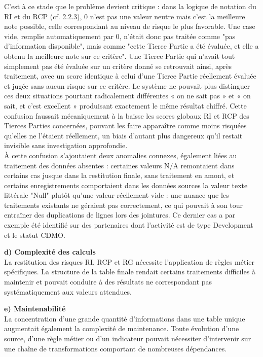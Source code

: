 C'est à ce stade que le problème devient critique : dans la logique de notation du RI et 
du RCP (cf. 2.2.3), 0 n'est pas une valeur neutre mais c'est la meilleure note possible, celle 
correspondant au niveau de risque le plus favorable. Une case vide, remplie automatiquement 
par 0, n'était donc pas traitée comme "pas d'information disponible", mais comme "cette Tierce 
Partie a été évaluée, et elle a obtenu la meilleure note sur ce critère". Une Tierce Partie qui 
n'avait tout simplement pas été évaluée sur un critère donné se retrouvait ainsi, après 
traitement, avec un score identique à celui d'une Tierce Partie réellement évaluée et jugée 
sans aucun risque sur ce critère. Le système ne pouvait plus distinguer ces deux situations 
pourtant radicalement différentes « on ne sait pas » et « on sait, et c'est excellent » produisant 
exactement le même résultat chiffré. Cette confusion faussait mécaniquement à la baisse les 
scores globaux RI et RCP des Tierces Parties concernées, pouvant les faire apparaître comme 
moins risquées qu'elles ne l'étaient réellement, un biais d'autant plus dangereux qu'il restait 
invisible sans investigation approfondie. \\

À cette confusion s'ajoutaient deux anomalies connexes, également liées au traitement 
des données absentes : certaines valeurs N/A remontaient dans certains cas jusque dans la 
restitution finale, sans traitement en amont, et certains enregistrements comportaient dans les 
données sources la valeur texte littérale "Null" plutôt qu'une valeur réellement vide : une 
nuance que les traitements existants ne géraient pas correctement, ce qui pouvait à son tour 
entraîner des duplications de lignes lors des jointures. Ce dernier cas a par exemple été 
identifié sur des partenaires dont l'activité est de type Development et le statut CDMO. 

\textbf{d) Complexité des calculs }\\
La restitution des risques RI, RCP et RG nécessite l’application de règles métier 
spécifiques. La structure de la table finale rendait certains traitements difficiles à maintenir et 
pouvait conduire à des résultats ne correspondant pas systématiquement aux valeurs 
attendues. 

\textbf{e) Maintenabilité }\\
La concentration d’une grande quantité d’informations dans une table unique augmentait 
également la complexité de maintenance. Toute évolution d’une source, d’une règle métier ou 
d’un indicateur pouvait nécessiter d’intervenir sur une chaîne de transformations comportant 
de nombreuses dépendances.\\

